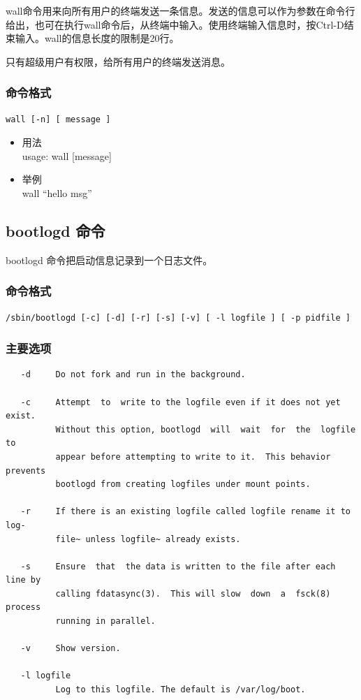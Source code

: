 wall命令用来向所有用户的终端发送一条信息。发送的信息可以作为参数在命令行给出，也可在执行wall命令后，从终端中输入。使用终端输入信息时，按Ctrl-D结束输入。wall的信息长度的限制是20行。

只有超级用户有权限，给所有用户的终端发送消息。

\subsubsection{命令格式}

{\begin{shaded}\begin{verbatim}
wall [-n] [ message ]
\end{verbatim}\end{shaded}}
\begin{itemize}
\item
  用法\\ usage: wall {[}message{]}
\item
  举例\\ wall ``hello msg''
\end{itemize}
\subsection{bootlogd 命令}

bootlogd 命令把启动信息记录到一个日志文件。

\subsubsection{命令格式}

{\begin{shaded}\begin{verbatim}
/sbin/bootlogd [-c] [-d] [-r] [-s] [-v] [ -l logfile ] [ -p pidfile ]
\end{verbatim}\end{shaded}}
\subsubsection{主要选项}

{\begin{shaded}\begin{verbatim}
   -d     Do not fork and run in the background.

   -c     Attempt  to  write to the logfile even if it does not yet exist.
          Without this option, bootlogd  will  wait  for  the  logfile  to
          appear before attempting to write to it.  This behavior prevents
          bootlogd from creating logfiles under mount points.

   -r     If there is an existing logfile called logfile rename it to log‐
          file~ unless logfile~ already exists.

   -s     Ensure  that  the data is written to the file after each line by
          calling fdatasync(3).  This will slow  down  a  fsck(8)  process
          running in parallel.

   -v     Show version.

   -l logfile
          Log to this logfile. The default is /var/log/boot.
\end{verbatim}\end{shaded}}
